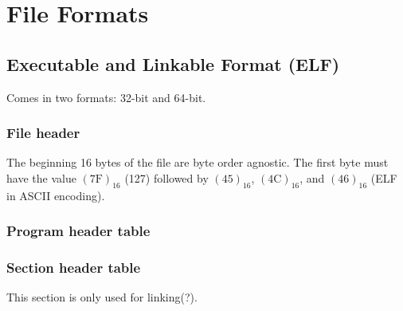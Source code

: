 \chapter{File Formats}

\section{Executable and Linkable Format (ELF)}

Comes in two formats: 32-bit and 64-bit.

\begin{center}
\end{center}

\subsection{File header}

The beginning 16 bytes of the file are byte order agnostic.
The first byte must have the value $(7\text{F})_{16}$ (127) followed by
$(45)_{16}$, $(4\text{C})_{16}$, and $(46)_{16}$ (ELF in ASCII encoding).

\subsection{Program header table}

\subsection{Section header table}

This section is only used for linking(?).
